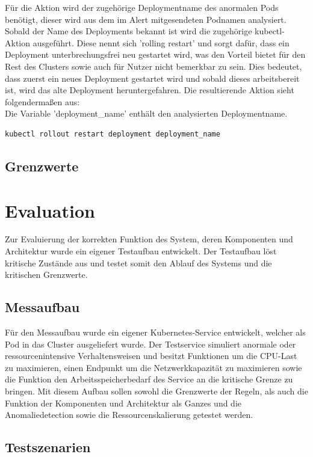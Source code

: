 \documentclass[a4paper,10pt]{scrartcl}
\begin{document}
Für die Aktion wird der zugehörige Deploymentname des anormalen Pods benötigt, dieser wird aus dem im Alert mitgesendeten Podnamen analysiert. Sobald der Name des Deployments bekannt ist wird die zugehörige kubectl-Aktion ausgeführt. Diese nennt sich 'rolling restart' und sorgt dafür, dass ein Deployment unterbrechungsfrei neu gestartet wird, was den Vorteil bietet für den Rest des Clusters sowie auch für Nutzer nicht bemerkbar zu sein. Dies bedeutet, dass zuerst ein neues Deployment gestartet wird und sobald dieses arbeitsbereit ist, wird das alte Deployment heruntergefahren. Die resultierende Aktion sieht folgendermaßen aus:\\
Die Variable 'deployment\_name' enthält den analysierten Deploymentname.
\begin{lstlisting}
kubectl rollout restart deployment deployment_name
\end{lstlisting}

\subsection{Grenzwerte}


\pagebreak
\section{Evaluation}

Zur Evaluierung der korrekten Funktion des System, deren Komponenten und Architektur wurde ein eigener Testaufbau entwickelt. Der Testaufbau löst kritische Zustände aus und testet somit den Ablauf des Systems und die kritischen Grenzwerte.

\subsection{Messaufbau}

Für den Messaufbau wurde ein eigener Kubernetes-Service entwickelt, welcher als Pod in das Cluster ausgeliefert wurde. Der Testservice simuliert anormale oder ressourcenintensive Verhaltensweisen und besitzt Funktionen um die CPU-Last zu maximieren, einen Endpunkt um die Netzwerkkapazität zu maximieren sowie die Funktion den Arbeitsspeicherbedarf des Service an die kritische Grenze zu bringen.
Mit diesem Aufbau sollen sowohl die Grenzwerte der Regeln, als auch die Funktion der Komponenten und Architektur als Ganzes und die Anomaliedetection sowie die Ressourcenskalierung getestet werden.

\subsection{Testszenarien}
\end{document}
